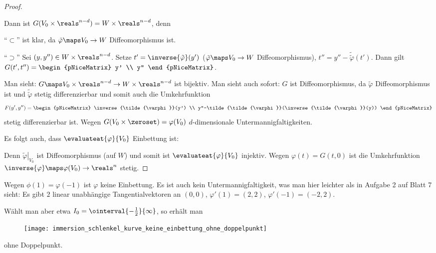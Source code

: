 \begin{proof}
\begin{subproof}
\begin{equation*}
    \end{equation*}
    Dann ist \( G(V_0\times\reals^{n-d})=W\times\reals^{n-d} \), denn
    \begin{proofdescription}
      \item[\enquote{\( \subset \)}] ist klar, da \( \tilde{\varphi}\maps V_0\to W \) Diffeomorphismus ist.
      \item[\enquote{\( \supset  \)}] Sei \( (y,y'')\in W\times\reals^{n-d} \). Setze \( t'=\inverse{\tilde{\varphi}}(y') \) (\( \tilde{\varphi}\maps V_0\to W \) Diffeomorphismus), \( t''=y''-\tilde{\tilde{\varphi}}(t') \). Dann gilt \( G(t',t'')=\begin{pNiceMatrix} y' \\ y'' \end{pNiceMatrix} \).
    \end{proofdescription}
    Man sieht:  \( G\maps V_0\times\reals^{n-d}\to W\times\reals^{n-d} \) ist bijektiv. Man sieht auch sofort: \( G \) ist Diffeomorphismus, da \( \tilde{\varphi} \) Diffeomorphismus ist und \( \tilde{\tilde{\varphi}} \) stetig differenzierbar und somit auch die Umkehrfunktion
    \begin{equation*}
      F(y',y'')=\begin{pNiceMatrix} \inverse{\tilde{\varphi}}(y') \\ y''-\tilde{\tilde{\varphi}}(\inverse{\tilde{\varphi}}(y)) \end{pNiceMatrix}
    \end{equation*}
    stetig differenzierbar ist. Wegen \( G(V_0\times \zeroset) =\varphi(V_0)\) \( d \)-dimensionale Untermannigfaltigkeiten.
  \end{subproof}
  Es folgt auch, dass \( \evaluateat{\varphi}{V_0} \) Einbettung ist:
  
  Denn \( \left.\tilde{\varphi}\right|_{V_0}  \)
   ist Diffeomorphismus (auf \( W \)) und somit ist
    \( \evaluateat{\varphi}{V_0} \) 
    injektiv. Wegen 
    \( \varphi(t)=G(t,0) \) 
    ist die Umkehrfunktion
     \( \inverse{\varphi}\maps \varphi(V_0)\to \reals^n \) 
     stetig.
\end{proof}
\begin{beispiel*}
  Wegen \( \phi(1)=\varphi(-1) \) ist \( \varphi \) keine Einbettung. Es ist auch kein Untermannigfaltigkeit, was man hier leichter als in Aufgabe 2 auf Blatt 7 sieht: Es gibt \( 2 \) linear unabhängige Tangentialvektoren an \( (0,0) \), \zb \( \varphi'(1)=(2,2) \), \( \varphi'(-1)=(-2,2) \). 
  
  Wählt man aber etwa \( I_0=\ointerval{-\frac{1}{2}}{\infty} \), so erhält man
  \begin{figure}[H]
    \centering
    \texttt{[image: immersion\_schlenkel\_kurve\_keine\_einbettung\_ohne\_doppelpunkt]}
    \label{fig:immersion_schlenkel_kurve_keine_einbettung_ohne_doppelpunkt}
  \end{figure}
  ohne Doppelpunkt.
\end{beispiel*}
